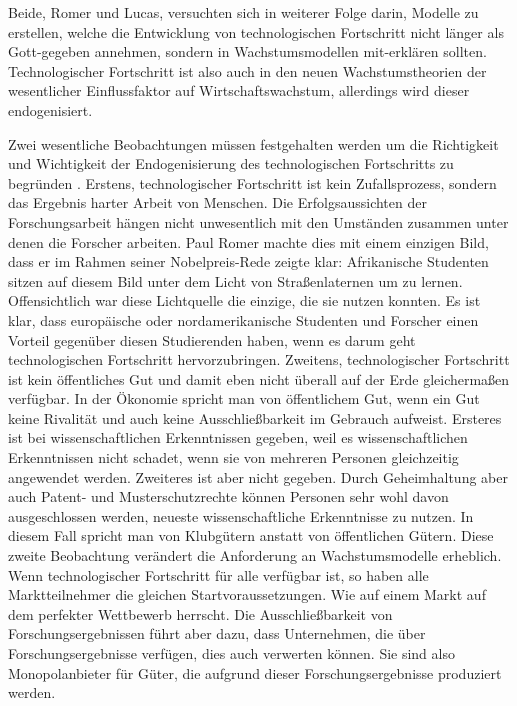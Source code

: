 Beide, Romer und Lucas, versuchten sich in weiterer Folge darin, Modelle zu erstellen, welche die Entwicklung von technologischen Fortschritt nicht länger als Gott-gegeben annehmen, sondern in Wachstumsmodellen mit-erklären sollten. Technologischer Fortschritt ist also auch in den neuen Wachstumstheorien der wesentlicher Einflussfaktor auf Wirtschaftswachstum, allerdings wird dieser endogenisiert.

Zwei wesentliche Beobachtungen müssen festgehalten werden um die Richtigkeit und Wichtigkeit der Endogenisierung des technologischen Fortschritts zu begründen \parencite{Romer1994}. Erstens, technologischer Fortschritt ist kein Zufallsprozess, sondern das Ergebnis harter Arbeit von Menschen. Die Erfolgsaussichten der Forschungsarbeit hängen nicht unwesentlich mit den Umständen zusammen unter denen die Forscher arbeiten. Paul Romer machte dies mit einem einzigen Bild, dass er im Rahmen seiner Nobelpreis-Rede zeigte klar: Afrikanische Studenten sitzen auf diesem Bild unter dem Licht von Straßenlaternen um zu lernen. Offensichtlich war diese Lichtquelle die einzige, die sie nutzen konnten. Es ist klar, dass europäische oder nordamerikanische Studenten und Forscher einen Vorteil gegenüber diesen Studierenden haben, wenn es darum geht technologischen Fortschritt hervorzubringen. Zweitens, technologischer Fortschritt ist kein öffentliches Gut und damit eben nicht überall auf der Erde gleichermaßen verfügbar. In der Ökonomie spricht man von öffentlichem Gut, wenn ein Gut keine Rivalität und auch keine Ausschließbarkeit im Gebrauch aufweist. Ersteres ist bei wissenschaftlichen Erkenntnissen gegeben, weil es wissenschaftlichen Erkenntnissen nicht schadet, wenn sie von mehreren Personen gleichzeitig angewendet werden. Zweiteres ist aber nicht gegeben. Durch Geheimhaltung aber auch Patent- und Musterschutzrechte können Personen sehr wohl davon ausgeschlossen werden, neueste wissenschaftliche Erkenntnisse zu nutzen. In diesem Fall spricht man von Klubgütern anstatt von öffentlichen Gütern.
Diese zweite Beobachtung verändert die Anforderung an Wachstumsmodelle erheblich. Wenn technologischer Fortschritt für alle verfügbar ist, so haben alle Marktteilnehmer die gleichen Startvoraussetzungen. Wie auf einem Markt auf dem perfekter Wettbewerb herrscht. Die Ausschließbarkeit von Forschungsergebnissen führt aber dazu, dass Unternehmen, die über Forschungsergebnisse verfügen, dies auch verwerten können. Sie sind also Monopolanbieter für Güter, die aufgrund dieser Forschungsergebnisse produziert werden. 

